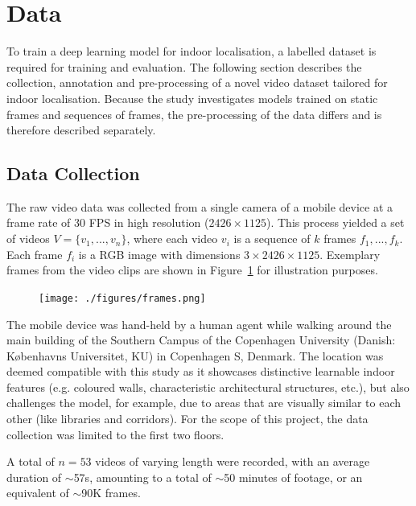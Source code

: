\documentclass[a4paper]{article}
\begin{document}
\section{Data}

To train a deep learning model for indoor localisation, a labelled dataset is
required for training and evaluation. The following section describes the
collection, annotation and pre-processing of a novel video dataset tailored for
indoor localisation. Because the study investigates models trained on static
frames and sequences of frames, the pre-processing of the data differs and is
therefore described separately.

\subsection{Data Collection} %
\label{sub:data-collection}

The raw video data was collected from a single camera of a mobile device at a
frame rate of 30 FPS in high resolution ($2426\times 1125$). This process
yielded a set of videos $V = \{v_1, ..., v_n\}$, where each video $v_i$ is a
sequence of $k$ frames $f_1, ..., f_k$. Each frame $f_i$ is a RGB image with
dimensions $3 \times 2426 \times 1125$. Exemplary frames from the video clips
are shown in Figure~\ref{fig:frames} for illustration purposes.


\begin{figure}
  \begin{center}
    \texttt{[image: ./figures/frames.png]}
  \end{center}
  \caption{}
  \label{fig:frames}
\end{figure}

The mobile device was hand-held by a human agent while walking around the main
building of the Southern Campus of the Copenhagen University (Danish:
K\o{}benhavns Universitet, KU) in Copenhagen S, Denmark. The location was deemed
compatible with this study as it showcases distinctive learnable indoor features
(e.g. coloured walls, characteristic architectural structures, etc.), but also
challenges the model, for example, due to areas that are visually similar to
each other (like libraries and corridors). For the scope of this project, the
data collection was limited to the first two floors. 



A total of $n=53$ videos of varying length were recorded, with an average
duration of $\sim$57s, amounting to a total of $\sim$50 minutes of
footage, or an equivalent of $\sim$90K frames. 
\end{document}
